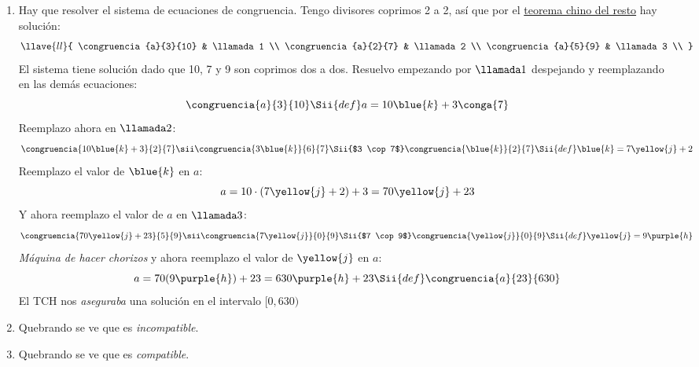\begin{enumerate}[label=\roman*)]
  \item Hay que resolver el sistema de ecuaciones de congruencia. Tengo
        divisores coprimos 2 a 2, así que por el \href{\chinito}{teorema
          chino del resto} hay solución:
        $$
          \llave{ll}{
            \congruencia{a}{3}{10} & \llamada1 \\
            \congruencia{a}{2}{7}  & \llamada2 \\
            \congruencia{a}{5}{9}  & \llamada3 \\
          }
        $$
        El sistema tiene solución dado que 10, 7 y 9 son coprimos dos a dos. Resuelvo empezando por $\llamada1$ despejando
        y reemplazando en las demás ecuaciones:
        $$
          \congruencia{a}{3}{10}
          \Sii{def}
          a = 10\blue{k} + 3 \conga{7}
        $$
        Reemplazo ahora en $\llamada2$:
        $$
          \congruencia{10 \blue{k} +3}{2}{7}
          \sii
          \congruencia{3\blue{k}}{6}{7}
          \Sii{$3 \cop 7$}
          \congruencia{\blue{k}}{2}{7}
          \Sii{def}
          \blue{k} = 7\yellow{j} + 2
        $$
        Reemplazo el valor de $\blue{k}$ en $a$:
        $$
          a = 10 \cdot ( 7\yellow{j} + 2) + 3 = 70 \yellow{j} + 23
        $$
        Y ahora reemplazo el valor de $a$ en $\llamada3$:
        $$
          \congruencia{70 \yellow{j} + 23}{5}{9}
          \sii
          \congruencia{7 \yellow{j}}{0}{9}
          \Sii{$7 \cop 9$}
          \congruencia{\yellow{j}}{0}{9}
          \Sii{def}
          \yellow{j} = 9\purple{h}
        $$
        \textit{Máquina de hacer chorizos}
        y ahora reemplazo el valor de $\yellow{j}$ en $a$:
        $$
          a = 70(9\purple{h}) + 23 = 630 \purple{h} + 23
          \Sii{def}
          \congruencia{a}{23}{630}
        $$
                El TCH nos \textit{aseguraba} una solución en el 
                intervalo $[0, 630)$ \Tilde

        \item Quebrando se ve que es \textit{incompatible}. 

        \item Quebrando se ve que es \textit{compatible}. 
\end{enumerate}


\begin{aportes}
	\item {}
\end{aportes}
